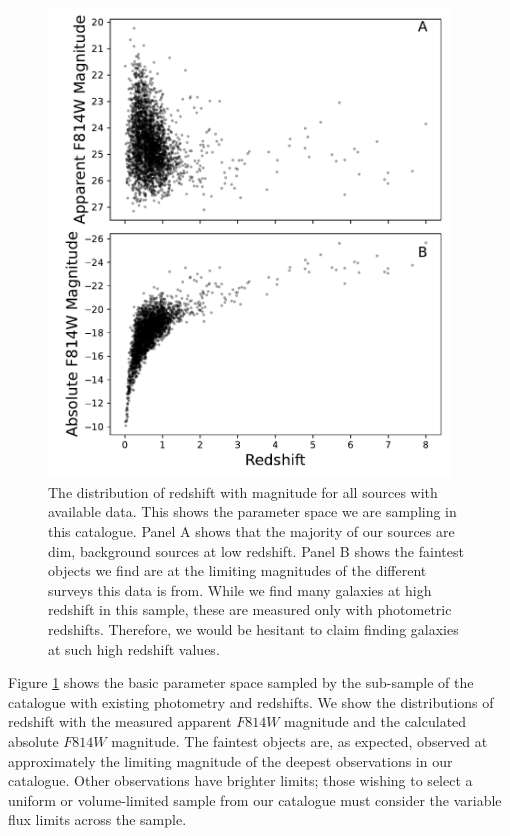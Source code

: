 {\begin{figure}
    \centering
    \includegraphics[width=0.95\textwidth]{Chapter2/figures/fig12.pdf}
    \caption[The distribution of redshift with magnitude for all sources with available data.]{The distribution of redshift with magnitude for all sources with available data. This shows the parameter space we are sampling in this catalogue. Panel A shows that the majority of our sources are dim, background sources at low redshift. Panel B shows the faintest objects we find are at the limiting magnitudes of the different surveys this data is from. While we find many galaxies at high redshift in this sample, these are measured only with photometric redshifts. Therefore, we would be hesitant to claim finding galaxies at such high redshift values.}
    \label{fig:redshift-mag-dist}
\end{figure}

Figure \ref{fig:redshift-mag-dist} shows the basic parameter space sampled by the sub-sample of the catalogue with existing photometry and redshifts. We show the distributions of redshift with the measured apparent $F814W$ magnitude and the calculated absolute $F814W$ magnitude. The faintest objects are, as expected, observed at approximately the limiting magnitude of the deepest observations in our catalogue. Other observations have brighter limits; those wishing to select a uniform or volume-limited sample from our catalogue must consider the variable flux limits across the sample.

}
